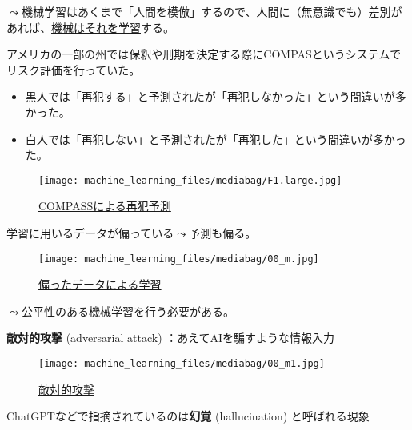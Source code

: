 \documentclass[
  xelatex,
  ja=standard]{bxjsarticle}
\providecommand{\tightlist}{%
  \setlength{\itemsep}{0pt}\setlength{\parskip}{0pt}}\usepackage{longtable,booktabs,array}
\begin{document}
\(\leadsto\)機械学習はあくまで「人間を模倣」するので、人間に（無意識でも）差別があれば、\href{https://ainow.ai/2020/02/17/183256/}{機械はそれを学習}する。

アメリカの一部の州では保釈や刑期を決定する際にCOMPASというシステムでリスク評価を行っていた。

\begin{itemize}
\tightlist
\item
  黒人では「再犯する」と予測されたが「再犯しなかった」という間違いが多かった。
\item
  白人では「再犯しない」と予測されたが「再犯した」という間違いが多かった。
\end{itemize}

\begin{figure}[htpb]

{\centering \texttt{[image: machine\_learning\_files/mediabag/F1.large.jpg]}

}

\caption{\href{https://www.axion.zone/is-the-recidivism-prediction-algorithm-fair-to-race/}{COMPASSによる再犯予測}}

\end{figure}

学習に用いるデータが偏っている\(\leadsto\)予測も偏る。

\begin{figure}[htpb]

{\centering \texttt{[image: machine\_learning\_files/mediabag/00\_m.jpg]}

}

\caption{\href{https://gigazine.net/news/20200702-twitter-ai-machine-learning-racism/}{偏ったデータによる学習}}

\end{figure}

\(\leadsto\)公平性のある機械学習を行う必要がある。

\textbf{敵対的攻撃} (adversarial attack) ：あえてAIを騙すような情報入力

\begin{figure}[htpb]

{\centering \texttt{[image: machine\_learning\_files/mediabag/00\_m1.jpg]}

}

\caption{\href{https://gigazine.net/news/20211130-universal-naturalistic-adversarial-patches/}{敵対的攻撃}}

\end{figure}

ChatGPTなどで指摘されているのは\textbf{幻覚} (hallucination)
と呼ばれる現象
\end{document}
